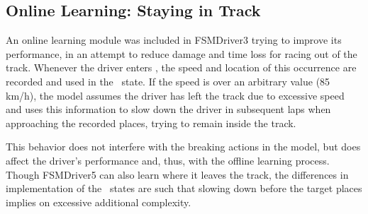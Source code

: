 \subsection{Online Learning: Staying in Track}%
An online learning module was included in FSMDriver3 trying to improve its performance, in an attempt to reduce damage and time loss for racing out of the track. Whenever the driver enters \OT, the speed and location of this occurrence are recorded and used in the \racing~state. If the speed is over an arbitrary value (85 km/h), the model assumes the driver has left the track due to excessive speed and uses this information to slow down the driver in subsequent laps when approaching the recorded places, trying to remain inside the track.

This behavior does not interfere with the breaking actions in the model, but does affect the driver's performance and, thus, with the offline learning process. Though FSMDriver5 can also learn where it leaves the track, the differences in implementation of the \racing~states are such that slowing down before the target places implies on excessive additional complexity.